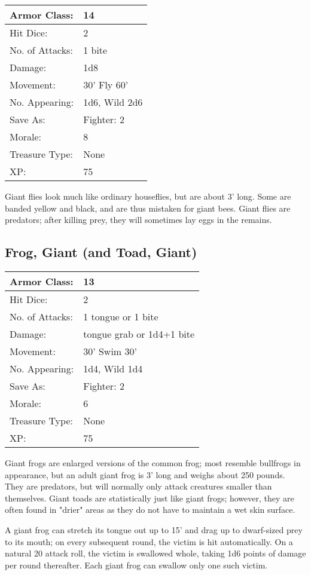 \documentclass[a4paper,twoside,openany,10pt]{book}
\begin{document}
\begin{multicols}{2}
\begin{tabularx}{0.48\textwidth}{@{}lX@{}}
Armor Class: & 14 \\\hline
Hit Dice: & 2 \\\hline
No. of Attacks: & 1 bite \\\hline
Damage: & 1d8 \\\hline
Movement: & 30' Fly 60' \\\hline
No. Appearing: & 1d6, Wild 2d6 \\\hline
Save As: & Fighter: 2 \\\hline
Morale: & 8 \\\hline
Treasure Type: & None \\\hline
XP: & 75 \\\hline
\end{tabularx}\medskip

Giant flies look much like ordinary houseflies, but are about 3' long. Some are banded yellow and black, and are thus mistaken for giant bees. Giant flies are predators; after killing prey, they will sometimes lay eggs in the remains.

\subsection*{Frog, Giant (and Toad, Giant)}
\begin{tabularx}{0.48\textwidth}{@{}lX@{}}
Armor Class: & 13 \\\hline
Hit Dice: & 2 \\\hline
No. of Attacks: & 1 tongue or 1 bite \\\hline
Damage: & tongue grab or 1d4+1 bite \\\hline
Movement: & 30' Swim 30' \\\hline
No. Appearing: & 1d4, Wild 1d4 \\\hline
Save As: & Fighter: 2 \\\hline
Morale: & 6 \\\hline
Treasure Type: & None \\\hline
XP: & 75 \\\hline
\end{tabularx}\medskip

Giant frogs are enlarged versions of the common frog; most resemble
bullfrogs in appearance, but an adult giant frog is 3'
long and weighs about 250 pounds. They are predators, but will normally
only attack creatures smaller than themselves. Giant toads are
statistically just like giant frogs; however, they are often found in
"drier" areas as they do not have to maintain a wet skin surface.

A giant frog can stretch its tongue out up to 15' and
drag up to dwarf-sized prey to its mouth; on every subsequent round, the
victim is hit automatically. On a natural 20 attack roll, the victim is
swallowed whole, taking 1d6 points of damage per round thereafter. Each
giant frog can swallow only one such victim.

\end{multicols}
\end{document}
